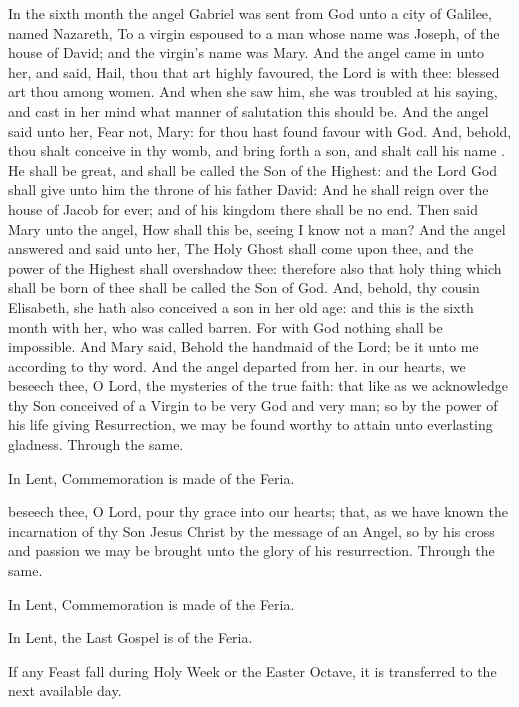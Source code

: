  In the sixth month the angel Gabriel was sent from God unto a city of Galilee, named Nazareth, To a virgin espoused to a man whose name was Joseph, of the house of David; and the virgin's name was Mary. And the angel came in unto her, and said, Hail, thou that art highly favoured, the Lord is with thee: blessed art thou among women. And when she saw him, she was troubled at his saying, and cast in her mind what manner of salutation this should be. And the angel said unto her, Fear not, Mary: for thou hast found favour with God. And, behold, thou shalt conceive in thy womb, and bring forth a son, and shalt call his name . He shall be great, and shall be called the Son of the Highest: and the Lord God shall give unto him the throne of his father David: And he shall reign over the house of Jacob for ever; and of his kingdom there shall be no end. Then said Mary unto the angel, How shall this be, seeing I know not a man? And the angel answered and said unto her, The Holy Ghost shall come upon thee, and the power of the Highest shall overshadow thee: therefore also that holy thing which shall be born of thee shall be called the Son of God. And, behold, thy cousin Elisabeth, she hath also conceived a son in her old age: and this is the sixth month with her, who was called barren. For with God nothing shall be impossible. And Mary said, Behold the handmaid of the Lord; be it unto me according to thy word. And the angel departed from her.
\secret
{} in our hearts, we beseech thee, O Lord, the mysteries of the true faith: that like as we acknowledge thy Son conceived of a Virgin to be very God and very man; so by the power of his life giving Resurrection, we may be found worthy to attain unto everlasting gladness. Through the same.
\begin{rubric}
    In Lent, Commemoration is made of the Feria.%
\end{rubric}
\postcommunion
{} beseech thee, O Lord, pour thy grace into our hearts; that, as we have known the incarnation of thy Son Jesus Christ by the message of an Angel, so by his cross and passion we may be brought unto the glory of his resurrection. Through the same.
\begin{rubric}
    In Lent, Commemoration is made of the Feria.%
\end{rubric}
\begin{rubric}
    In Lent, the Last Gospel is of the Feria.%
\end{rubric}
\begin{rubric}
    If any Feast fall during Holy Week or the Easter Octave, it is transferred to the next available day.
\end{rubric}


